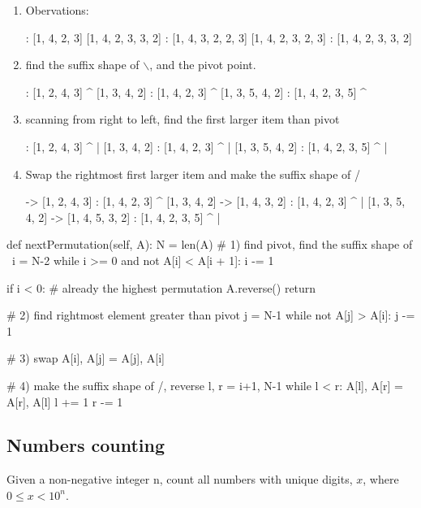 \begin{enumerate}
\item Obervations:
\begin{python}
[1, 2, 3, 4]  [1, 2, 4, 3]
[1, 3, 4, 2] : [1, 4, 2, 3]
[1, 4, 2, 3, 3, 2] : [1, 4, 3, 2, 2, 3]
[1, 4, 2, 3, 2, 3] : [1, 4, 2, 3, 3, 2]
\end{python}
\item find the suffix shape of $\backslash$, and the pivot point.
\begin{python}
[1, 2, 3, 4] : [1, 2, 4, 3]
       ^
[1, 3, 4, 2] : [1, 4, 2, 3]
    ^
[1, 3, 5, 4, 2] : [1, 4, 2, 3, 5]
    ^
\end{python}
\item scanning from right to left, find the first larger item than pivot
\begin{python}
[1, 2, 3, 4] : [1, 2, 4, 3]
       ^  |
[1, 3, 4, 2] : [1, 4, 2, 3]
    ^  |
[1, 3, 5, 4, 2] : [1, 4, 2, 3, 5]
    ^     |
\end{python}
\item Swap the rightmost first larger item and make the suffix shape of /
\begin{python}
[1, 2, 3, 4] -> [1, 2, 4, 3] : [1, 4, 2, 3]
       ^
[1, 3, 4, 2] -> [1, 4, 3, 2] : [1, 4, 2, 3]
    ^  |
[1, 3, 5, 4, 2] -> [1, 4, 5, 3, 2] : [1, 4, 2, 3, 5]
    ^     |
\end{python}
\end{enumerate}
\begin{python}
def nextPermutation(self, A):
  N = len(A)
  # 1) find pivot, find the suffix shape of \
  i = N-2
  while i >= 0 and not A[i] < A[i + 1]:
    i -= 1

  if i < 0:
    # already the highest permutation
    A.reverse()
    return

  # 2) find rightmost element greater than pivot
  j = N-1
  while not A[j] > A[i]:
    j -= 1

  # 3) swap
  A[i], A[j] = A[j], A[i]

  # 4) make the suffix shape of /, reverse
  l, r = i+1, N-1
  while l < r:
    A[l], A[r] = A[r], A[l]
    l += 1
    r -= 1
\end{python}
\subsection{Numbers counting}
 Given a non-negative integer n, count all numbers with unique digits, $x$, where $0 \leq x < 10^n$.

